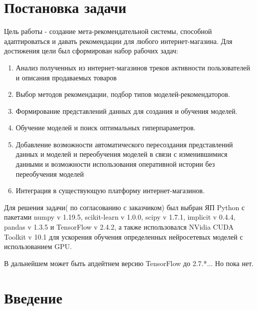 \documentclass[14pt]{mmcs_article}
\begin{document}

\renewcommand{\contentsname}{Оглавление}

\tableofcontents

\newpage
{}

\section*{Постановка задачи}


Цель работы - создание мета-рекомендательной системы, способной адаптироваться и давать рекомендации для любого интернет-магазина. Для достижения цели был сформирован набор рабочих задач:
\begin{enumerate}
	\item Анализ полученных из интернет-магазинов треков активности пользователей и описания продаваемых товаров
	\item Выбор методов рекомендации, подбор типов моделей-рекомендаторов.
	\item Формирование представлений данных для создания и обучения моделей.
	\item Обучение моделей и поиск оптимальных гиперпараметров.
	\item Добавление возможности автоматического пересоздания представлений данных и моделей и переобучения моделей в связи с изменившимися данными и возможности использования оперативной истории без переобучения моделей
	\item Интеграция в существующую платформу интернет-магазинов.
\end{enumerate}

Для решения задачи( по согласованию с заказчиком) был выбран ЯП Python с пакетами numpy v 1.19.5, scikit-learn v 1.0.0, scipy v 1.7.1, implicit v 0.4.4, pandas v 1.3.5 и TensorFlow v 2.4.2, а также использовался NVidia CUDA Toolkit v 10.1 для ускорения обучения определенных нейросетевых моделей с использованием GPU.

В дальнейшем может быть апдейтнем версию TensorFlow до 2.7.*... Но пока нет. 


\newpage
{}
\section*{Введение}
\end{document}
